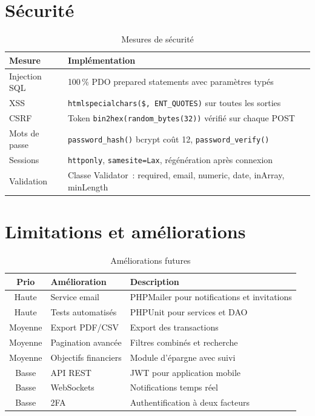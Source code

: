 \documentclass[12pt,a4paper,twoside]{report}
\begin{document}
\chapter{Sécurité}

\begin{table}[H]
  \centering
  \begin{tabularx}{\textwidth}{lL}
    \toprule
    \textbf{Mesure} & \textbf{Implémentation} \\
    \midrule
    Injection SQL & 100\,\% PDO prepared statements avec paramètres typés \\
    XSS & \texttt{htmlspecialchars(\$, ENT\_QUOTES)} sur toutes les sorties \\
    CSRF & Token \texttt{bin2hex(random\_bytes(32))} vérifié sur chaque POST \\
    Mots de passe & \texttt{password\_hash()} bcrypt coût 12, \texttt{password\_verify()} \\
    Sessions & \texttt{httponly}, \texttt{samesite=Lax}, régénération après connexion \\
    Validation & Classe Validator~: required, email, numeric, date, inArray, minLength \\
    \bottomrule
  \end{tabularx}
  \caption{Mesures de sécurité}
\end{table}

\chapter{Limitations et améliorations}

\begin{table}[H]
  \centering
  \begin{tabularx}{\textwidth}{cLL}
    \toprule
    \textbf{Prio} & \textbf{Amélioration} & \textbf{Description} \\
    \midrule
    Haute & Service email & PHPMailer pour notifications et invitations \\
    Haute & Tests automatisés & PHPUnit pour services et DAO \\
    Moyenne & Export PDF/CSV & Export des transactions \\
    Moyenne & Pagination avancée & Filtres combinés et recherche \\
    Moyenne & Objectifs financiers & Module d'épargne avec suivi \\
    Basse & API REST & JWT pour application mobile \\
    Basse & WebSockets & Notifications temps réel \\
    Basse & 2FA & Authentification à deux facteurs \\
    \bottomrule
  \end{tabularx}
  \caption{Améliorations futures}
\end{table}
\end{document}
